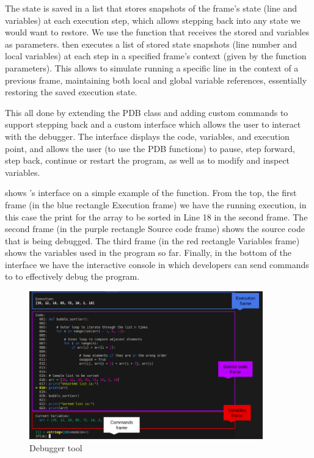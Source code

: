 The state is saved in a list that stores snapshots of the frame's state (line and variables) at each 
execution step, which allows stepping back into any state we would want to restore. We use the  
 function that receives the stored  and  variables as 
parameters.  then executes a list of stored state snapshots (line number 
and local variables) at each step in a specified frame's context (given by the function parameters). 
This allows \flik to simulate running a specific line in the context of a previous frame, maintaining 
both local and global variable references, essentially restoring the saved execution state.

This all done by extending the \ac{PDB} class and adding custom commands to support stepping 
back and a custom interface which allows the user to interact with the debugger. The interface 
displays the code, variables, and execution point, and allows the user (to use the \ac{PDB} 
functions) to pause, step forward, step back, continue or restart the program, as well as to 
modify and inspect variables. 

 shows \flik's interface on a simple example of the  function. From 
the top, the first frame (in the blue rectangle Execution frame) we have the running execution, in this 
case the print for the array to be sorted in Line 18 in the second frame. The second frame (in the 
purple rectangle Source code frame) shows the source code that is being debugged. The third frame 
(in the red rectangle Variables frame) shows the variables used in the program so far. Finally, in the 
bottom of the interface we have the interactive console in which developers can send commands to 
\flik to effectively debug the program.

\begin{figure}[hptb]
    \centering
    \includegraphics[width=0.9\textwidth]{figures/flik_interface.png}
    \caption{Debugger tool}
    \label{fig:debugger}
\end{figure}

